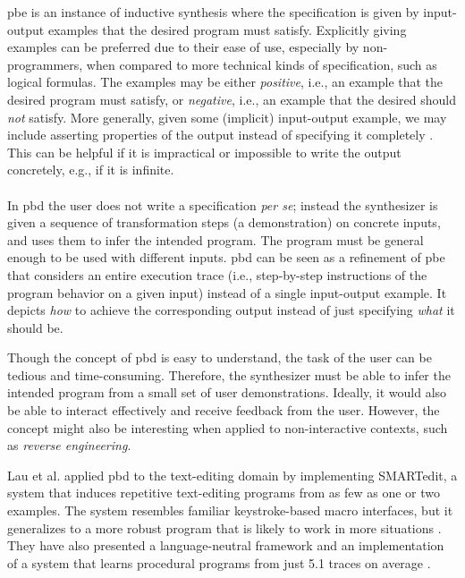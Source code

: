 \gls{pbe} is an instance of inductive synthesis where the specification is given
by input-output examples that the desired program must satisfy.
Explicitly giving examples can be preferred due to their ease of use, especially
by non-programmers, when compared to more technical kinds of specification, such
as logical formulas.
The examples may be either \textit{positive}, i.e., an example that the desired
program must satisfy, or \textit{negative}, i.e., an example that the desired
should \textit{not} satisfy.
More generally, given some (implicit) input-output example, we may include asserting
properties of the output instead of specifying it completely
\cite{Polozov:2015:FFI}.
This can be helpful if it is impractical or impossible
to write the output concretely, e.g., if it is infinite.

\paragraph{}

In \gls{pbd} the user does not write a specification \textit{per se};
instead the synthesizer is given a sequence of transformation steps (a
demonstration) on concrete inputs, and uses them to infer the intended program.
The program must be general enough to be used with different inputs.
\gls{pbd} can be seen as a refinement of \gls{pbe} that
considers an entire execution trace (i.e., step-by-step instructions of the
program behavior on a given input) instead of a single input-output example.
It depicts \textit{how} to achieve the corresponding output instead of just
specifying \textit{what} it should be.

Though the concept of \gls{pbd} is easy to understand, the task of the user can
be tedious and time-consuming. Therefore, the synthesizer must be able to infer
the intended program from a small set of user demonstrations.
Ideally, it would also be able to interact effectively and receive feedback from
the user.
However, the concept might also be interesting when applied to non-interactive
contexts, such as \textit{reverse engineering}.

Lau et al. applied \gls{pbd} to the text-editing domain by implementing
SMARTedit, a system that induces repetitive text-editing programs from as few as
one or two examples. The system resembles familiar keystroke-based macro
interfaces, but it generalizes to a more robust program that is likely to work
in more situations \cite{Lau2003}.
They have also presented a language-neutral framework and an implementation of a
system that learns procedural programs from just 5.1 traces on average
\cite{Lau:traces:2003}.

